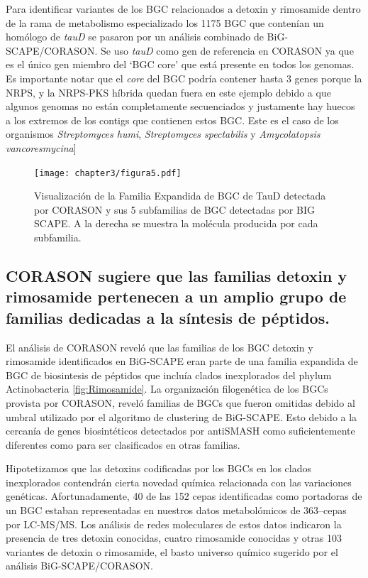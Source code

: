 \documentclass[12pt,twoside]{reedthesis}
\begin{document}
  Para identificar variantes de los BGC relacionados a detoxin y
  rimosamide dentro de la rama de metabolismo especializado los 1175 BGC
  que contenían un homólogo de \emph{tauD} se pasaron por un análisis
  combinado de BiG-SCAPE/CORASON. Se uso \emph{tauD} como gen de
  referencia en CORASON ya que es el único gen miembro del `BGC core' que
  está presente en todos los genomas. Es importante notar que el
  \emph{core} del BGC podría contener hasta 3 genes porque la NRPS, y la
  NRPS-PKS híbrida quedan fuera en este ejemplo debido a que algunos
  genomas no están completamente secuenciados y justamente hay huecos a
  los extremos de los contigs que contienen estos BGC. Este es el caso de
  los organismos \emph{Streptomyces humi}, \emph{Streptomyces spectabilis}
  y \emph{Amycolatopsis vancoresmycina}{]}
  
  \begin{figure}[h!tbp]
  \centering
  \texttt{[image: chapter3/figura5.pdf]}
  \caption[Rimosamide]{\footnotesize{Visualización de la Familia Expandida de BGC de TauD detectada por CORASON y sus 5 subfamilias de BGC detectadas por BIG SCAPE. A la derecha se muestra la molécula producida por cada subfamilia.}}
  \label{fig:Rimosamide}
  \end{figure}
  
  \subsection{CORASON sugiere que las familias detoxin y rimosamide
  pertenecen a un amplio grupo de familias dedicadas a la síntesis de
  péptidos.}\label{corason-sugiere-que-las-familias-detoxin-y-rimosamide-pertenecen-a-un-amplio-grupo-de-familias-dedicadas-a-la-sintesis-de-peptidos.}
  
  El análisis de CORASON reveló que las familias de los BGC detoxin y
  rimosamide identificados en BiG-SCAPE eran parte de una familia
  expandida de BGC de biosintesis de péptidos que incluía clados
  inexplorados del phylum Actinobacteria \autoref{fig:Rimosamide}. La
  organización filogenética de los BGCs provista por CORASON, reveló
  familias de BGCs que fueron omitidas debido al umbral utilizado por el
  algoritmo de clustering de BiG-SCAPE. Esto debido a la cercanía de genes
  biosintéticos detectados por antiSMASH como suficientemente diferentes
  como para ser clasificados en otras familias.
  
  Hipotetizamos que las detoxins codificadas por los BGCs en los clados
  inexplorados contendrán cierta novedad química relacionada con las
  variaciones genéticas. Afortunadamente, 40 de las 152 cepas
  identificadas como portadoras de un BGC estaban representadas en
  nuestros datos metabolómicos de 363--cepas por LC-MS/MS. Los análisis de
  redes moleculares de estos datos indicaron la presencia de tres detoxin
  conocidas, cuatro rimosamide conocidas y otras 103 variantes de detoxin
  o rimosamide, el basto universo químico sugerido por el análisis
  BiG-SCAPE/CORASON.
  
\end{document}
